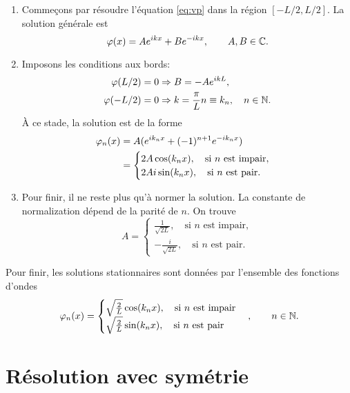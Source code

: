 \documentclass[11pt,a4paper,oneside]{article}
\begin{document}
\begin{enumerate}
    \item Commeçons par résoudre l'équation \eqref{eq:vp} dans la région $[-L/2,L/2]$. La solution générale est
    \begin{equation}
        \varphi(x)=Ae^{ikx}+Be^{-ikx},\qquad A,B\in\mathbb{C}.
    \end{equation}
    \item Imposons les conditions aux bords:
    \begin{align}
        \varphi(L/2) &= 0 \Rightarrow B = -Ae^{ikL},\\
        \varphi(-L/2) &= 0 \Rightarrow k=\frac{\pi}{L}n\equiv k_n,\quad n\in \mathbb{N}.
    \end{align}
    À ce stade, la solution est de la forme
    \begin{align}
        \varphi_n(x) &= A(e^{ik_nx}+(-1)^{n+1}e^{-ik_nx})\\
        &= 
        \begin{cases}
            2A\cos(k_nx),\quad \text{si $n$ est impair},\\
            2Ai\sin(k_nx),\quad \text{si $n$ est pair}.
        \end{cases}
    \end{align}
    \item Pour finir, il ne reste plus qu'à normer la solution. La constante de normalization dépend de la parité de $n$. On trouve
    \begin{equation}
        A=
        \begin{cases}
            \frac{1}{\sqrt{2L}} ,\quad \text{si $n$ est impair},\\
            -\frac{i}{\sqrt{2L}} ,\quad \text{si $n$ est pair}.
        \end{cases}
    \end{equation}
\end{enumerate}
Pour finir, les solutions stationnaires sont données par l'ensemble des fonctions d'ondes
\begin{equation}
    \varphi_n(x) = 
        \begin{cases}
            \sqrt{\frac{2}{L}}\cos(k_nx),\quad \text{si $n$ est impair}\\
            \sqrt{\frac{2}{L}}\sin(k_nx),\quad \text{si $n$ est pair}
        \end{cases},\qquad n\in\mathbb{N}.\label{eq:solfin}
\end{equation}

\section{Résolution avec symétrie}
\end{document}
